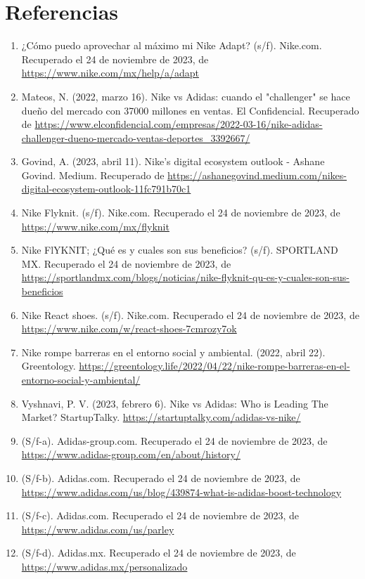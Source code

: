 \documentclass[a4paper,12pt]{article}
\begin{document}
\clearpage
\newpage

\section{Referencias}

\begin{enumerate}
	\item ¿Cómo puedo aprovechar al máximo mi Nike Adapt? (s/f). Nike.com. Recuperado el 24 de noviembre de 2023, de \url{https://www.nike.com/mx/help/a/adapt}
	\item Mateos, N. (2022, marzo 16). Nike vs Adidas: cuando el "challenger" se hace dueño del mercado con 37000 millones en ventas. El Confidencial. Recuperado de \url{https://www.elconfidencial.com/empresas/2022-03-16/nike-adidas-challenger-dueno-mercado-ventas-deportes_3392667/}
	\item Govind, A. (2023, abril 11). Nike's digital ecosystem outlook - Ashane Govind. Medium. Recuperado de \url{https://ashanegovind.medium.com/nikes-digital-ecosystem-outlook-11fc791b70c1}
	\item Nike Flyknit. (s/f). Nike.com. Recuperado el 24 de noviembre de 2023, de \url{https://www.nike.com/mx/flyknit}
	\item Nike FlYKNIT; ¿Qué es y cuales son sus beneficios? (s/f). SPORTLAND MX. Recuperado el 24 de noviembre de 2023, de \url{https://sportlandmx.com/blogs/noticias/nike-flyknit-qu-es-y-cuales-son-sus-beneficios}
	\item Nike React shoes. (s/f). Nike.com. Recuperado el 24 de noviembre de 2023, de \url{https://www.nike.com/w/react-shoes-7cmrozy7ok}
	\item Nike rompe barreras en el entorno social y ambiental. (2022, abril 22). Greentology. \url{https://greentology.life/2022/04/22/nike-rompe-barreras-en-el-entorno-social-y-ambiental/}
	\item Vyshnavi, P. V. (2023, febrero 6). Nike vs Adidas: Who is Leading The Market? StartupTalky. \url{https://startuptalky.com/adidas-vs-nike/}
	\item (S/f-a). Adidas-group.com. Recuperado el 24 de noviembre de 2023, de \url{https://www.adidas-group.com/en/about/history/}
	\item (S/f-b). Adidas.com. Recuperado el 24 de noviembre de 2023, de \url{https://www.adidas.com/us/blog/439874-what-is-adidas-boost-technology}
	\item (S/f-c). Adidas.com. Recuperado el 24 de noviembre de 2023, de \url{https://www.adidas.com/us/parley}
	\item (S/f-d). Adidas.mx. Recuperado el 24 de noviembre de 2023, de \url{https://www.adidas.mx/personalizado}

\end{enumerate}
\end{document}
